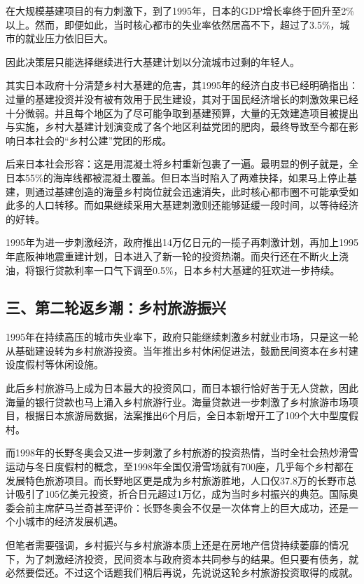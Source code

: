 在大规模基建项目的有力刺激下，到了1995年，日本的GDP增长率终于回升至2\%以上。然而，即便如此，当时核心都市的失业率依然居高不下，超过了3.5\%，城市的就业压力依旧巨大。

因此决策层只能选择继续进行大基建计划以分流城市过剩的年轻人。

其实日本政府十分清楚乡村大基建的危害，其1995年的经济白皮书已经明确指出：过量的基建投资并没有被有效用于民生建设，其对于国民经济增长的刺激效果已经十分微弱。并且每个地区为了尽可能争取到基建预算，大量的无效建造项目被提出与实施，乡村大基建计划演变成了各个地区利益党团的肥肉，最终导致至今都在影响日本社会的“乡村公建”党团的形成。

后来日本社会形容：这是用混凝土将乡村重新包裹了一遍。最明显的例子就是，全日本55\%的海岸线都被混凝土覆盖。但日本当时陷入了两难抉择，如果马上停止基建，则通过基建创造的海量乡村岗位就会迅速消失，此时核心都市圈不可能承受如此多的人口转移。而如果继续采用大基建刺激则还能够延缓一段时间，以等待经济的好转。

1995年为进一步刺激经济，政府推出14万亿日元的一揽子再刺激计划，再加上1995年底阪神地震重建计划，日本进入了新一轮的投资热潮。而央行还在不断火上浇油，将银行贷款利率一口气下调至0.5\%，日本乡村大基建的狂欢进一步持续。

\subsection{三、第二轮返乡潮：乡村旅游振兴}

1995年在持续高压的城市失业率下，政府只能继续刺激乡村就业市场，只是这一轮从基础建设转为乡村旅游投资。当年推出乡村休闲促进法，鼓励民间资本在乡村建设度假村等休闲设施。

此后乡村旅游马上成为日本最大的投资风口，而日本银行恰好苦于无人贷款，因此海量的银行贷款也马上涌入乡村旅游行业。海量贷款进一步刺激了乡村旅游市场项目，根据日本旅游局数据，法案推出6个月后，全日本新增开工了109个大中型度假村。

而1998年的长野冬奥会又进一步刺激了乡村旅游的投资热情，当时全社会热炒滑雪运动与冬日度假村的概念，至1998年全国仅滑雪场就有700座，几乎每个乡村都在发展特色旅游项目。而长野地区更是成为乡村旅游胜地，人口仅37.8万的长野市总计吸引了105亿美元投资，折合日元超过1万亿，成为当时乡村振兴的典范。国际奥委会前主席萨马兰奇甚至评价：长野冬奥会不仅是一次体育上的巨大成功，还是一个小城市的经济发展机遇。

但笔者需要强调，乡村振兴与乡村旅游本质上还是在房地产信贷持续萎靡的情况下，为了刺激经济投资，民间资本与政府资本共同参与的结果。但只要有债务，就必然要偿还。不过这个话题我们稍后再说，先说说这轮乡村旅游投资取得的成就。

